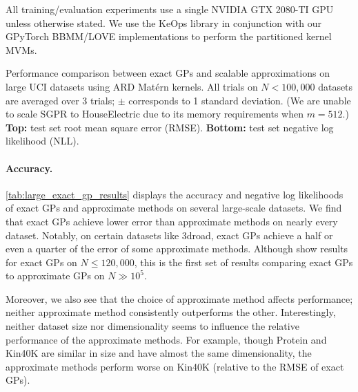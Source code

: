 All training/evaluation experiments use a single NVIDIA GTX 2080-TI GPU unless otherwise stated.
We use the KeOps library \cite{charlier2020kernel} in conjunction with our GPyTorch BBMM/LOVE implementations to perform the partitioned kernel MVMs.

\begin{table}[!tb]
  \caption[Performance comparison between exact GPs and scalable approximations on large UCI datasets.]{
    Performance comparison between exact GPs and scalable approximations on large UCI datasets using ARD Mat\'ern kernels.
    All trials on $N < 100,\!000$ datasets are averaged over 3 trials; $\pm$ corresponds to 1 standard deviation.
    (We are unable to scale SGPR to HouseElectric due to its memory requirements when $m=512$.)
    {\bf Top:} test set root mean square error (RMSE).
    {\bf Bottom:} test set negative log likelihood (NLL).
  }
  \label{tab:large_exact_gp_results}
  \centering
  \vspace{1em}

  \resizebox{\textwidth}{!}{%
    
  }
  \vspace{1em}

  \resizebox{\textwidth}{!}{%
    
  }
  \vspace{1em}
\end{table}

\paragraph{Accuracy.}
\cref{tab:large_exact_gp_results} displays the accuracy and negative log likelihoods of exact GPs and approximate methods on several large-scale datasets.
We find that exact GPs achieve lower error than approximate methods on nearly every dataset.
Notably, on certain datasets like 3droad, exact GPs achieve a half or even a quarter of the error of some approximate methods.
Although \citet{nguyen2019exact} show results for exact GPs on $N \leq 120,\!000$, this is the first set of results comparing exact GPs to approximate GPs on $N\gg 10^5$.

Moreover, we also see that the choice of approximate method affects performance; neither approximate method consistently outperforms the other.
Interestingly, neither dataset size nor dimensionality seems to influence the relative performance of the approximate methods.
For example, though Protein and Kin40K are similar in size and have almost the same dimensionality, the approximate methods perform worse on Kin40K (relative to the RMSE of exact GPs).

